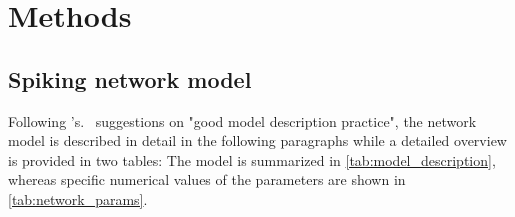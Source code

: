 \chapter{Methods}
\label{sec:methods}

\section{Spiking network model}
\label{subsec:methods_simulation}
Following \citeauthor{nordlie2009}'s.~\cite{nordlie2009} suggestions on 
"good model description practice",
the network model is described in detail in the following paragraphs while a detailed 
overview is provided in two tables: The model is summarized in 
\autoref{tab:model_description}, 
whereas specific numerical values of the parameters are shown in 
\autoref{tab:network_params}. 


